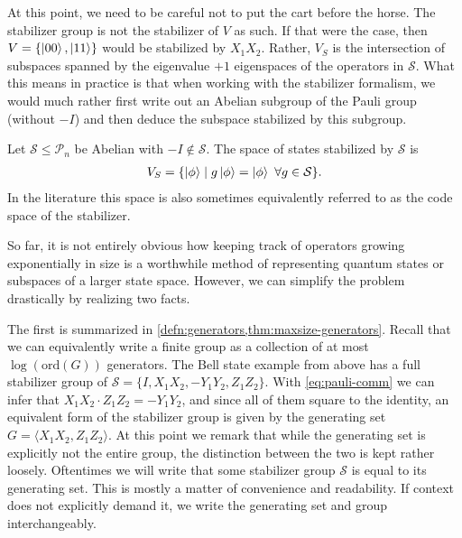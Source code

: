At this point, we need to be careful not to put the cart before the horse. The
stabilizer group is not the stabilizer of $V$ as such. If that were the case,
then $V = \{ \ket{00}, \ket{11}\}$ would be stabilized by $X_1X_2$. Rather,
$V_S$ is the intersection of subspaces spanned by the eigenvalue $+1$
eigenspaces of the operators in $\mathcal{S}$. What this means in practice is
that when working with the stabilizer formalism, we would much rather first
write out an Abelian subgroup of the Pauli group (without $-I$) and then deduce
the subspace stabilized by this subgroup. 

\begin{defn}\label{defn:stab-statespace}
  Let $\mathcal{S} \leq \mathcal{P}_n$ be Abelian with $-I \not\in
  \mathcal{S}$. The space of states stabilized by $\mathcal{S}$ is
  \begin{align}
    V_S = \{ \ket{\phi} \mid g\ket{\phi} = \ket{\phi} \ \forall g \in
    \mathcal{S} \}
  .\end{align}
  In the literature this space
  is also sometimes equivalently referred to as the code space of the
  stabilizer.
\end{defn}

So far, it is not entirely obvious how keeping track of operators growing
exponentially in size is a worthwhile method of representing quantum states or
subspaces of a larger state space. However, we can simplify the problem
drastically by realizing two facts.

The first is summarized in \cref{defn:generators,thm:maxsize-generators}.
Recall that we can equivalently write a finite group as a collection of at most
$\log(\mathrm{ord}(G))$ generators. The Bell state example from above has a
full stabilizer group of $\mathcal{S} = \{I, X_1X_2, -Y_1Y_2, Z_1Z_2\}$. With
\cref{eq:pauli-comm} we can infer that $X_1X_2\cdot Z_1Z_2 = -Y_1Y_2$, and
since all of them square to the identity, an equivalent form of the stabilizer
group is given by the generating set $G = \langle X_1X_2, Z_1Z_2\rangle$.
At this point we remark that while the generating set is explicitly not the entire group, the
distinction between the two is kept rather loosely. Oftentimes we will write
that some stabilizer group $\mathcal{S}$ is equal to its generating set. This is mostly a matter of
convenience and readability. If context does not explicitly demand it, we write
the generating set and group interchangeably.

